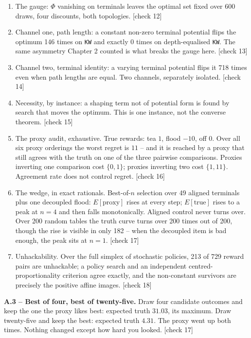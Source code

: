 \begin{enumerate}
\item The gauge: $\Phi$ vanishing on terminals leaves the optimal set fixed over 600 draws, four discounts, both topologies. [check 12]
\item Channel one, path length: a constant non-zero terminal potential flips the optimum 146 times on \texttt{KW} and exactly 0 times on depth-equalised \texttt{KW}. The same asymmetry Chapter 2 counted is what breaks the gauge here. [check 13]
\item Channel two, terminal identity: a varying terminal potential flips it 718 times even when path lengths are equal. Two channels, separately isolated. [check 14]
\item Necessity, by instance: a shaping term not of potential form is found by search that moves the optimum. This is one instance, not the converse theorem. [check 15]
\item The proxy audit, exhaustive. True rewards: tea $1$, flood $-10$, off $0$. Over all six proxy orderings the worst regret is $11$ -- and it is reached by a proxy that still agrees with the truth on one of the three pairwise comparisons. Proxies inverting one comparison cost $\{0, 1\}$; proxies inverting two cost $\{1, 11\}$. Agreement rate does not control regret. [check 16]
\item The wedge, in exact rationals. Best-of-$n$ selection over 49 aligned terminals plus one decoupled flood: $E[\text{proxy}]$ rises at every step; $E[\text{true}]$ rises to a peak at $n = 4$ and then falls monotonically. Aligned control never turns over. Over 200 random tables the truth curve turns over 200 times out of 200, though the rise is visible in only 182 -- when the decoupled item is bad enough, the peak sits at $n = 1$. [check 17]
\item Unhackability. Over the full simplex of stochastic policies, 213 of 729 reward pairs are unhackable; a policy search and an independent centred-proportionality criterion agree exactly, and the non-constant survivors are precisely the positive affine images. [check 18]
\end{enumerate}


\textbf{A.3 -- Best of four, best of twenty-five.} Draw four candidate outcomes and keep the one the proxy likes best: expected truth $31.03$, its maximum. Draw twenty-five and keep the best: expected truth $4.31$. The proxy went up both times. Nothing changed except how hard you looked. [check 17]

